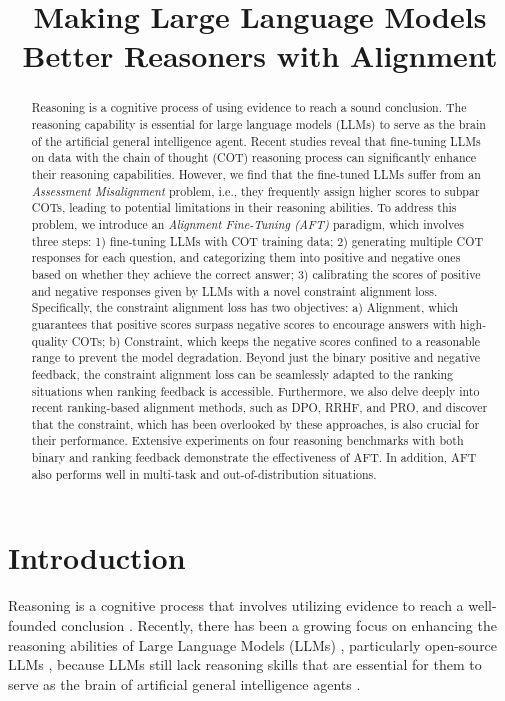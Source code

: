 \title{Making Large Language Models Better Reasoners with Alignment}

\begin{abstract}
Reasoning is a cognitive process of using evidence to reach a sound conclusion. The reasoning capability is essential for large language models (LLMs) to serve as the brain of the artificial general intelligence agent. Recent studies reveal that fine-tuning LLMs on data with the chain of thought (COT) reasoning process can significantly enhance their reasoning capabilities. However, we find that the fine-tuned LLMs suffer from an \textit{Assessment Misalignment} problem, i.e., they frequently assign higher scores to subpar COTs, leading to potential limitations in their reasoning abilities. To address this problem, we introduce an \textit{Alignment Fine-Tuning (AFT)} paradigm, which involves three steps: 1) fine-tuning LLMs with COT training data; 2) generating multiple COT responses for each question, and categorizing them into positive and negative ones based on whether they achieve the correct answer; 3) calibrating the scores of positive and negative responses given by LLMs with a novel constraint alignment loss. Specifically, the constraint alignment loss has two objectives: a) Alignment, which guarantees that positive scores surpass negative scores to encourage answers with high-quality COTs; b) Constraint, which keeps the negative scores confined to a reasonable range to prevent the model degradation. Beyond just the binary positive and negative feedback, the constraint alignment loss can be seamlessly adapted to the ranking situations when ranking feedback is accessible. Furthermore, we also delve deeply into recent ranking-based alignment methods, such as DPO, RRHF, and PRO, and discover that the constraint, which has been overlooked by these approaches, is also crucial for their performance. Extensive experiments on four reasoning benchmarks with both binary and ranking feedback demonstrate the effectiveness of AFT. In addition, AFT also performs well in multi-task and out-of-distribution situations.
\end{abstract}

\section{Introduction}
Reasoning is a cognitive process that involves utilizing evidence to reach a well-founded conclusion \citep{qiao-etal-2023-reasoning,huang-chang-2023-towards}. Recently, there has been a growing focus on enhancing the reasoning abilities of Large Language Models (LLMs) \citep{li-etal-2023-making}, particularly open-source LLMs \citep{rft,luo2023wizardmath,mukherjee2023orca}, because LLMs still lack reasoning skills \citep{wang2023large,wang2023far,zheng2023judging} that are essential for them to serve as the brain of artificial general intelligence agents \citep{wang2023voyager,react2023,song2023restgpt}.

